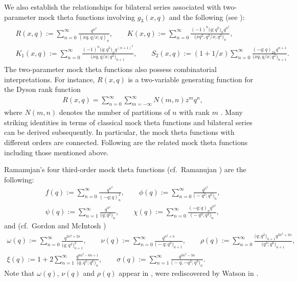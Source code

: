 \documentclass[10pt,a4paper]{amsart}
\numberwithin{equation}{section}
\begin{document}
We also establish the relationships for bilateral series associated
with two-parameter mock theta functions involving $g_3(x,q)$ and the following (see \cite{K,McI1,Mo1}):
\begin{gather*}
\begin{split}
& R(x,q):=\sum_{n=0}^{\infty}\frac{q^{n^2}}{(xq,q/x;q)_n},\qquad
K(x,q):=\sum_{n=0}^{\infty}\frac{(-1)^n\bigl(q;q^2\bigr)_nq^{n^2}}
{\bigl(xq^2,q^2/x;q^2\bigr)_n},\\
& K_1(x,q):=\sum_{n=0}^{\infty}\frac{(-1)^n\bigl(q;q^2\bigr)_nq^{(n+1)^2}} {\bigl(xq,q/x;q^2\bigr)_{n+1}},\qquad
S_2(x,q):=(1+1/x)\sum_{n=0}^{\infty}\frac{(-q;q)_{2n}q^{n+1}}
{\bigl(xq,q/x;q^2\bigr)_{n+1}}.
\end{split}
\end{gather*}
The two-parameter mock theta functions also possess combinatorial interpretations. For instance, $R(x,q)$ is a two-variable generating function for the Dyson rank function
\begin{align*}
R(x,q)=\sum_{n=0}^{\infty}\sum_{m=-\infty}^{\infty}N(m,n)z^mq^n,
\end{align*}
where $N(m,n)$ denotes the number of partitions of $n$ with rank $m$ \cite{Dyson}.
Many striking identities in terms of classical mock theta functions and bilateral series can be derived subsequently. In particular, the mock theta functions with different orders are connected. Following are the related mock theta functions including those mentioned above.

Ramanujan's four third-order mock theta functions (cf.~Ramanujan \cite{R}) are the following:
\begin{align*}
f(q):=\sum_{n=0}^{\infty}\frac{q^{n^2}}{(-q;q)_n^2},\qquad
\phi(q):=\sum_{n=0}^{\infty}\frac{q^{n^2}}{\bigl(-q^2;q^2\bigr)_n},\\
\psi(q):=\sum_{n=1}^{\infty}\frac{q^{n^2}}{\bigl(q;q^2\bigr)_n},\qquad
\chi(q):=\sum_{n=0}^{\infty}\frac{(-q;q)_nq^{n^2}}{\bigl(-q^3;q^3\bigr)_n},
\end{align*}
and (cf.\ Gordon and McIntosh \cite{GM1})
\begin{gather*}
\omega(q):=\sum_{n=0}^{\infty}\frac{q^{2n^2+2n}}{\bigl(q;q^2\bigr)_{n+1}^2},\qquad
\nu(q):=\sum_{n=0}^{\infty}\frac{q^{n^2+n}}{\bigl(-q;q^2\bigr)_{n+1}},\qquad\rho(q):=\sum_{n=0}^{\infty}\frac{\bigl(q;q^2\bigr)_{n+1}q^{2n^2+2n}}{\bigl(q^3;q^6\bigr)_{n+1}},\\
\xi(q):=1+2\sum_{n=1}^{\infty}\frac{q^{6n^2-6n+1}}{\bigl(q,q^5;q^6\bigr)_n},\qquad
\sigma(q):=\sum_{n=1}^{\infty}\frac{q^{3n^2-3n}}{\bigl(-q,-q^2;q^3\bigr)_n}.
\end{gather*}
Note that $\omega(q)$, $\nu(q)$ and $\rho(q)$ appear in \cite{R}, were rediscovered by Watson in \cite{W1}.
\end{document}
